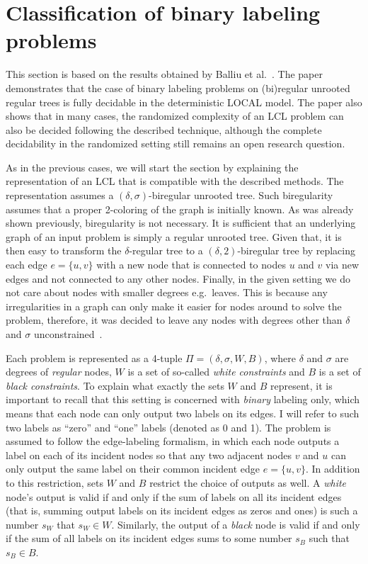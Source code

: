 \section{Classification of binary labeling problems}

This section is based on the results obtained by Balliu et al.~\cite{Balliu2019c}. The paper demonstrates
that the case of binary labeling problems on (bi)regular unrooted regular trees is fully decidable in
the deterministic LOCAL model. The paper also shows that in many cases, the randomized complexity of an LCL problem
can also be decided following the described technique, although the complete decidability in the randomized setting
still remains an open research question.

As in the previous cases, we will start the section by explaining the representation of an LCL that is compatible
with the described methods. The representation assumes a $(\delta, \sigma)$-biregular unrooted tree.
Such biregularity assumes that a proper 2-coloring of the graph is initially known.
As was already shown previously, biregularity is not necessary. It is
sufficient that an underlying graph of an input problem is simply a regular
unrooted tree. Given that, it is then easy to transform the $\delta$-regular tree
to a $(\delta, 2)$-biregular tree by replacing each edge $e = \{u, v\}$ with a new node that is
connected to nodes $u$ and $v$ via new edges and not connected to any other nodes. Finally,
in the given setting we do not care about nodes with smaller degrees e.g.\ leaves. This is
because any irregularities in a graph can only make it easier for nodes around to solve
the problem, therefore, it was decided to leave any nodes with degrees other than $\delta$
and $\sigma$ unconstrained~\cite{Balliu2019c}.

Each problem is represented as a 4-tuple $\Pi = (\delta, \sigma, W, B)$, where
$\delta$ and $\sigma$ are degrees of \emph{regular} nodes, $W$ is a set of so-called
\emph{white constraints} and $B$ is a set of \emph{black constraints}. To
explain what exactly the sets $W$ and $B$ represent, it is important to recall that
this setting is concerned with \emph{binary} labeling only, which means that each node
can only output two labels on its edges. I will refer to such two labels as ``zero'' and ``one''
labels (denoted as 0 and 1). The problem is assumed to follow the edge-labeling
formalism, in which each node outputs a label on each of its incident nodes so that
any two adjacent nodes $v$ and $u$ can only output the same label on their common
incident edge $e = \{u, v\}$. In addition to this restriction, sets $W$ and $B$
restrict the choice of outputs as well. A \emph{white} node's output is valid
if and only if the sum of labels on all its incident edges (that is, summing
output labels on its incident edges as zeros and ones) is such a number $s_W$ that
$s_W \in W$. Similarly, the output of a \emph{black} node is valid if and only if
the sum of all labels on its incident edges sums to some number $s_B$ such that
$s_B \in B$.

